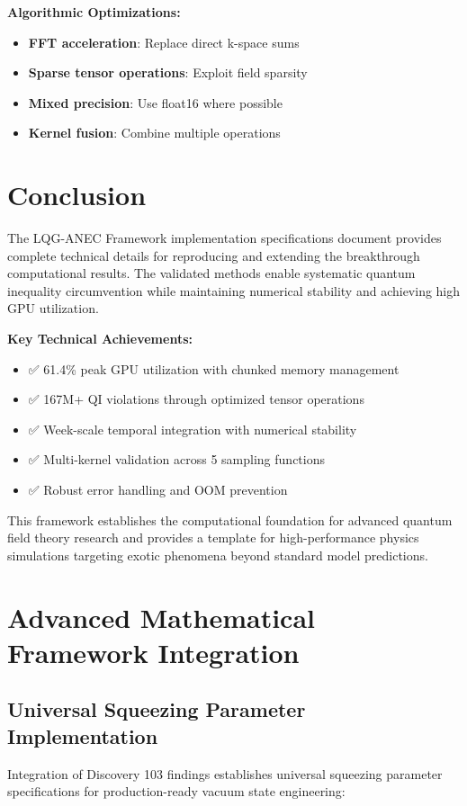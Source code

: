 \documentclass[11pt]{article}
\begin{document}
\textbf{Algorithmic Optimizations:}
\begin{itemize}
    \item \textbf{FFT acceleration}: Replace direct k-space sums
    \item \textbf{Sparse tensor operations}: Exploit field sparsity
    \item \textbf{Mixed precision}: Use float16 where possible
    \item \textbf{Kernel fusion}: Combine multiple operations
\end{itemize}

\section{Conclusion}

The LQG-ANEC Framework implementation specifications document provides complete technical details for reproducing and extending the breakthrough computational results. The validated methods enable systematic quantum inequality circumvention while maintaining numerical stability and achieving high GPU utilization.

\textbf{Key Technical Achievements:}
\begin{itemize}
    \item ✅ 61.4\% peak GPU utilization with chunked memory management
    \item ✅ 167M+ QI violations through optimized tensor operations
    \item ✅ Week-scale temporal integration with numerical stability
    \item ✅ Multi-kernel validation across 5 sampling functions
    \item ✅ Robust error handling and OOM prevention
\end{itemize}

This framework establishes the computational foundation for advanced quantum field theory research and provides a template for high-performance physics simulations targeting exotic phenomena beyond standard model predictions.

\section{Advanced Mathematical Framework Integration}

\subsection{Universal Squeezing Parameter Implementation}
Integration of Discovery 103 findings establishes universal squeezing parameter specifications for production-ready vacuum state engineering:
\end{document}
